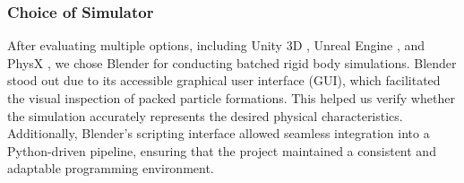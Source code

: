 \documentclass[preprint,12pt]{elsarticle}
\begin{document}
\subsubsection{Choice of Simulator}
After evaluating multiple options, including Unity 3D \citep{unity2024unity}, Unreal Engine \citep{unreal2024epic}, and PhysX \citep{nvidia2024nvidia}, we chose Blender for conducting batched rigid body simulations. 
Blender stood out due to its accessible graphical user interface (GUI), which facilitated the visual inspection of packed particle formations. 
This helped us verify whether the simulation accurately represents the desired physical characteristics.
Additionally, Blender's scripting interface allowed seamless integration into a Python-driven pipeline, ensuring that the project maintained a consistent and adaptable programming environment.
\end{document}
